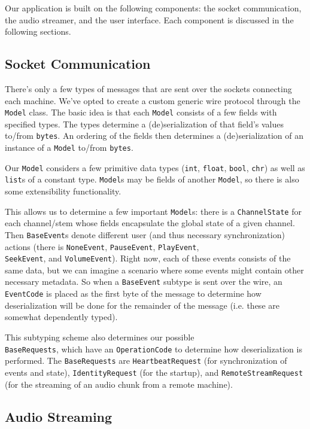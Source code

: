 \documentclass[%
               nonacm,sigconf,10pt]{acmart}
\newcommand{\py}[1]{\texttt{#1}}
\begin{document}
Our application is built on the following components: the socket communication, the audio streamer, and the user interface. Each component is discussed in the following sections.

\subsection{Socket Communication}\label{subsec:soc-com}

There's only a few types of messages that are sent over the sockets connecting each machine. We've opted to create a custom generic wire protocol through the \py{Model} class. The basic idea is that each \py{Model} consists of a few fields with specified types. The types determine a (de)serialization of that field's values to/from \py{bytes}. An ordering of the fields then determines a (de)serialization of an instance of a \py{Model} to/from \py{bytes}.

Our \py{Model} considers a few primitive data types (\py{int}, \py{float}, \py{bool}, \py{chr}) as well as \py{list}s of a constant type. \py{Model}s may be fields of another \py{Model}, so there is also some extensibility functionality.

This allows us to determine a few important \py{Model}s: there is a \py{ChannelState} for each channel/stem whose fields encapsulate the global state of a given channel. Then \py{BaseEvent}s denote different user (and thus necessary synchronization) actions (there is \py{NoneEvent}, \py{PauseEvent}, \py{PlayEvent}, \\ \py{SeekEvent}, and \py{VolumeEvent}). Right now, each of these events consists of the same data, but we can imagine a scenario where some events might contain other necessary metadata. So when a \py{BaseEvent} subtype is sent over the wire, an \py{EventCode} is placed as the first byte of the message to determine how deserialization will be done for the remainder of the message (i.e. these are somewhat dependently typed).

This subtyping scheme also determines our possible \\ \py{BaseRequests}, which have an \py{OperationCode} to determine how deserialization is performed. The \py{BaseRequests} are \py{HeartbeatRequest} (for synchronization of events and state), \py{IdentityRequest} (for the startup), and \py{RemoteStreamRequest} (for the streaming of an audio chunk from a remote machine).

\subsection{Audio Streaming}\label{subsec:audio-stream}
\end{document}
